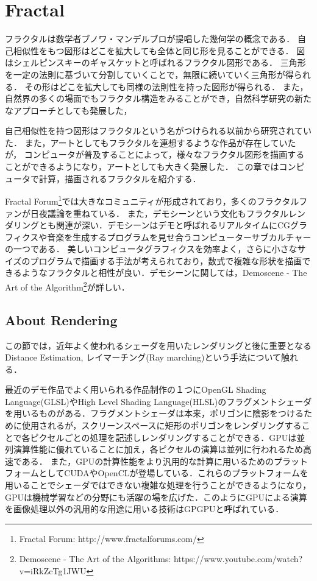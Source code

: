 \section{Fractal}

フラクタルは数学者ブノワ・マンデルブロが提唱した幾何学の概念である．
自己相似性をもつ図形はどこを拡大しても全体と同じ形を見ることができる．
図はシェルピンスキーのギャスケットと呼ばれるフラクタル図形である．
三角形を一定の法則に基づいて分割していくことで，無限に続いていく三角形が得られる．
その形はどこを拡大しても同様の法則性を持った図形が得られる．
また，自然界の多くの場面でもフラクタル構造をみることができ，自然科学研究の新たなアプローチとしても発展した，

自己相似性を持つ図形はフラクタルという名がつけられる以前から研究されていた．
また，アートとしてもフラクタルを連想するような作品が存在していたが，
コンピュータが普及することによって，様々なフラクタル図形を描画することができるようになり，アートとしても大きく発展した．
この章ではコンピュータで計算，描画されるフラクタルを紹介する．

Fractal Forum\footnote{Fractal Forum:  http://www.fractalforums.com/}では大きなコミュニティが形成されており，多くのフラクタルファンが日夜議論を重ねている．
また，デモシーンという文化もフラクタルレンダリングとも関連が深い．デモシーンはデモと呼ばれるリアルタイムにCGグラフィクスや音楽を生成するプログラムを見せ合うコンピューターサブカルチャーの一つである．
美しいコンピュータグラフィクスを効率よく，さらに小さなサイズのプログラムで描画する手法が考えられており，数式で複雑な形状を描画できるようなフラクタルと相性が良い．デモシーンに関しては，Demoscene - The Art of the Algorithm\footnote{Demoscene - The Art of the Algorithms: https://www.youtube.com/watch?v=iRkZcTg1JWU}が詳しい．

\subsection{About Rendering}

この節では，近年よく使われるシェーダを用いたレンダリングと後に重要となるDistance Estimation, レイマーチング(Ray marching)という手法について触れる．

最近のデモ作品でよく用いられる作品制作の１つにOpenGL Shading Language(GLSL)やHigh Level Shading Language(HLSL)のフラグメントシェーダを用いるものがある．フラグメントシェーダは本来，ポリゴンに陰影をつけるために使用されるが，スクリーンスペースに矩形のポリゴンをレンダリングすることで各ピクセルごとの処理を記述しレンダリングすることができる．GPUは並列演算性能に優れていることに加え，各ピクセルの演算は並列に行われるため高速である．
また，GPUの計算性能をより汎用的な計算に用いるためのプラットフォームとしてCUDAやOpenCLが登場している．これらのプラットフォームを用いることでシェーダではできない複雑な処理を行うことができるようになり，GPUは機械学習などの分野にも活躍の場を広げた．このようにGPUによる演算を画像処理以外の汎用的な用途に用いる技術はGPGPUと呼ばれている．

